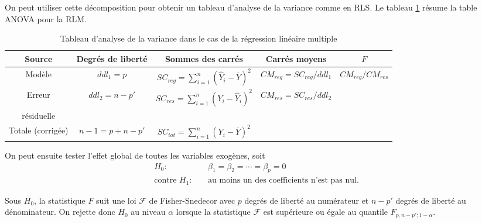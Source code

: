 
On peut utiliser cette décomposition pour obtenir un tableau d'analyse de la variance comme en RLS. Le tableau \ref{table:anova} résume la table ANOVA pour la RLM.


\begin{table}[htb!]
\caption{Tableau d'analyse de la variance dans le cas de la régression linéaire multiple}\label{table:anova}
\centering
\begin{footnotesize}
\renewcommand{\arraystretch}{1.6}
\begin{tabular}{ccccc}\hline
Source & Degrés de liberté & Sommes des carrés & Carrés moyens & $F$ \\ \hline
Modèle & $ddl_1=p$ &
$SC_{reg}=\sum_{i=1}^n(\hat Y_i-\bar Y)^2$ & $CM_{reg}=SC_{reg}/ddl_1$ & $CM_{reg}/CM_{res}$\\
Erreur & $ddl_2=n-p'$ & $SC_{res}=\sum_{i=1}^n(Y_i-\hat Y_i)^2$ & $CM_{res}=SC_{res}/ddl_2$ & \\
résiduelle & & & \\
\hline Totale (corrigée) & $n-1=p+n-p'$ & $SC_{tot}=\sum_{i=1}^n(Y_i-\bar Y)^2$ & &
\end{tabular}
\end{footnotesize}
\end{table}

On peut ensuite tester l'effet global de toutes les variables exogènes, soit
\begin{eqnarray}
H_0:&~&\beta_1=\beta_2=\cdots=\beta_{p}=0\label{H0:Ftest}\\
\mbox{contre\ }H_1:&~&\mbox{au moins un des coefficients n'est pas nul.}\nonumber
\end{eqnarray}


Sous $H_0$, la statistique $F$ suit une loi $\mathcal F$ de Fisher-Snedecor avec $p$ degrés de liberté au numérateur et $n-p'$ degrés de liberté au
dénominateur. On rejette donc $H_0$ au niveau $\alpha$ lorsque la statistique
$\mathcal F$ est supérieure ou égale au quantile
$F_{p,n-p';1-\alpha}$.\\


